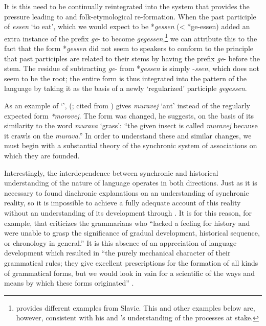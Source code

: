 It is this need to be continually reintegrated into the system that
provides the pressure leading to  and
folk-etymological re-formation. When the past participle of 
\emph{essen} `to eat', which we would expect to be *\emph{gessen} (<
*ge-essen) added an extra instance of the prefix \emph{ge}- to become
\emph{gegessen},\footnote{{\Kruszewski} provides different examples from
  Slavic. This and other  examples below are, however,
  consistent with his and {\Baudouin}'s understanding of the processes at
  stake.} we can attribute this to the fact that the form
*\emph{gessen} did not seem to speakers to conform to the principle
that  past participles are related to their stems by having the
prefix \emph{ge}- before the stem. The residue of subtracting
\emph{ge}- from *\emph{gessen} is simply -\emph{ssen}, which does not
seem to be the root; the entire form is thus integrated into the
pattern of the language by taking it as the basis of a newly
`regularized' participle \emph{gegessen}.

As an example of `', {\Kruszewski}
(\citeyear{kruszewski79:analogy}; cited from
\citet[62]{williams93:kruszewski}) gives  \emph{muravej}
`ant' instead of the regularly expected form \emph{*morovej}. The form
was changed, he suggests, on the basis of its similarity to the word
\emph{murava} `grass': ``the given insect is called \emph{muravej}
because it crawls on the \emph{murava}.''  In order to understand
these and similar changes, we must begin with a substantial theory of
the synchronic system of associations on which they are founded.

Interestingly, the interdependence between synchronic and historical
understanding of the nature of language operates in both
directions. Just as it is necessary to found diachronic explanations
on an understanding of synchronic reality, so it is impossible to
achieve a fully adequate account of this reality without an
understanding of its development through . It is for
this reason, for example, that {\DeCourtenay} criticizes the
 grammarians who ``lacked a feeling for history and were unable
to grasp the significance of gradual development, historical sequence,
or chronology in general.'' It is this absence of an appreciation of
language development which resulted in ``the purely mechanical
character of their grammatical rules; they give excellent
prescriptions for the formation of all kinds of grammatical forms, but
we would look in vain for a scientific  of the ways and
means by which these forms originated''
\citep[147f.]{baudouin95:attempt}. 

